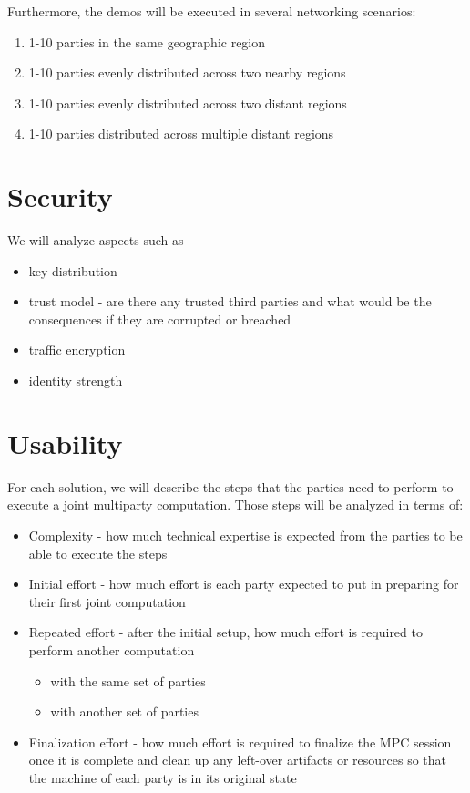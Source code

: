 Furthermore, the demos will be executed in several networking scenarios:

\begin{enumerate}
\def\labelenumi{\arabic{enumi}.}
\tightlist
\item
  1-10 parties in the same geographic region
\item
  1-10 parties evenly distributed across two nearby regions
\item
  1-10 parties evenly distributed across two distant regions
\item
  1-10 parties distributed across multiple distant regions
\end{enumerate}

\hypertarget{security}{%
\section{Security}\label{security}}

We will analyze aspects such as

\begin{itemize}
\tightlist
\item
  key distribution
\item
  trust model - are there any trusted third parties and what would be
  the consequences if they are corrupted or breached
\item
  traffic encryption
\item
  identity strength
\end{itemize}

\hypertarget{usability}{%
\section{Usability}\label{usability}}

For each solution, we will describe the steps that the parties need to
perform to execute a joint multiparty computation. Those steps will be
analyzed in terms of:

\begin{itemize}
\tightlist
\item
  Complexity - how much technical expertise is expected from the parties
  to be able to execute the steps
\item
  Initial effort - how much effort is each party expected to put in
  preparing for their first joint computation
\item
  Repeated effort - after the initial setup, how much effort is required
  to perform another computation

  \begin{itemize}
  \tightlist
  \item
    with the same set of parties
  \item
    with another set of parties
  \end{itemize}
\item
  Finalization effort - how much effort is required to finalize the MPC
  session once it is complete and clean up any left-over artifacts or
  resources so that the machine of each party is in its original state
\end{itemize}


